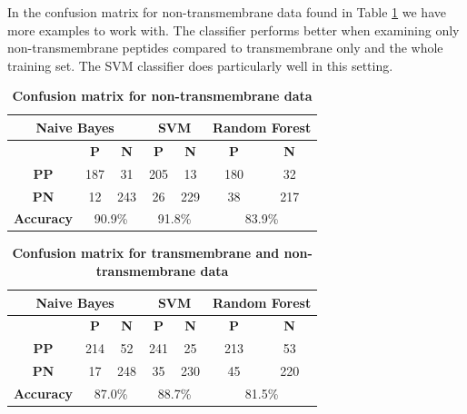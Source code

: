 \documentclass[10pt,letterpaper]{article}
\begin{document}
	In the confusion matrix for non-transmembrane data found in Table \ref{tab:conf-non-tm} we have more examples to work with. The classifier performs better when examining only non-transmembrane peptides compared to transmembrane only and the whole training set. The SVM classifier does particularly well in this setting. 
	
	\begin{table}[!ht]
		\centering
		\caption{{\bf Confusion matrix for non-transmembrane data}}
		\label{tab:conf-non-tm}
		\begin{tabular}{ccccccc}
			\multicolumn{3}{c}{Naive Bayes}                                             & \multicolumn{2}{c}{SVM}                      & \multicolumn{2}{c}{Random Forest} \\ \hline
			& \textbf{P} & \multicolumn{1}{c|}{\textbf{N}} & \textbf{P} & \multicolumn{1}{c|}{\textbf{N}} & \textbf{P}      & \textbf{N}      \\ \hline
			\textbf{PP}                  & 187        & \multicolumn{1}{c|}{31}         & 205        & \multicolumn{1}{c|}{13}         & 180             & 32              \\
			\textbf{PN}                  & 12         & \multicolumn{1}{c|}{243}        & 26         & \multicolumn{1}{c|}{229}        & 38              & 217             \\ \hline
			\multicolumn{1}{l}{\textbf{Accuracy}} & \multicolumn{2}{c}{90.9\%}                   & \multicolumn{2}{c}{91.8\%}                   & \multicolumn{2}{c}{83.9\%}       
		\end{tabular}
		\end{table}

	\begin{table}[!ht]
		\centering
		\caption{{\bf Confusion matrix for transmembrane and non-transmembrane data }}
		\label{tab:conf-all}
		\begin{tabular}{ccccccc}
			\multicolumn{3}{c}{Naive Bayes}                                  & \multicolumn{2}{c}{SVM}                      & \multicolumn{2}{c}{Random Forest} \\ \hline
			& \textbf{P} & \multicolumn{1}{c|}{\textbf{N}} & \textbf{P} & \multicolumn{1}{c|}{\textbf{N}} & \textbf{P}      & \textbf{N}      \\ \hline
			\textbf{PP}       & 214        & \multicolumn{1}{c|}{52}         & 241        & \multicolumn{1}{c|}{25}         & 213             & 53              \\
			\textbf{PN}       & 17         & \multicolumn{1}{c|}{248}        & 35         & \multicolumn{1}{c|}{230}        & 45              & 220             \\ \hline
			\textbf{Accuracy} & \multicolumn{2}{c}{87.0\%}                   & \multicolumn{2}{c}{88.7\%}                   & \multicolumn{2}{c}{81.5\%}       
		\end{tabular}
	\end{table}
	
\end{document}
